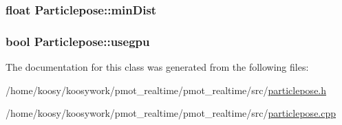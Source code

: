 \hypertarget{class_particlepose_a827812bbc2da3926fd03c1a7e8e4e287}{
\subsubsection[{min\-Dist}]{\setlength{\rightskip}{0pt plus 5cm}float {\bf \-Particlepose\-::min\-Dist}}}\label{class_particlepose_a827812bbc2da3926fd03c1a7e8e4e287}
\hypertarget{class_particlepose_ac70adde4c1af0773ec887721283b98db}{
\subsubsection[{usegpu}]{\setlength{\rightskip}{0pt plus 5cm}bool {\bf \-Particlepose\-::usegpu}}}\label{class_particlepose_ac70adde4c1af0773ec887721283b98db}


\-The documentation for this class was generated from the following files\-:\begin{DoxyCompactItemize}
\item 
/home/koosy/koosywork/pmot\-\_\-realtime/pmot\-\_\-realtime/src/\hyperlink{particlepose_8h}{particlepose.\-h}\item 
/home/koosy/koosywork/pmot\-\_\-realtime/pmot\-\_\-realtime/src/\hyperlink{particlepose_8cpp}{particlepose.\-cpp}\end{DoxyCompactItemize}
